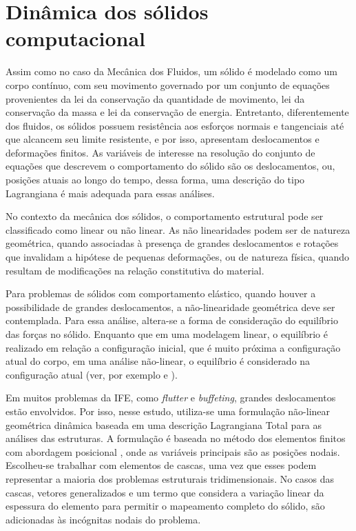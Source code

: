 \chapter[Dinâmica dos sólidos computacional]{Dinâmica dos sólidos computacional} \label{capitulo:Cap4}

Assim como no caso da Mecânica dos Fluidos, um sólido é modelado como um corpo contínuo, com seu movimento governado por um conjunto de equações provenientes da lei da conservação da quantidade de movimento, lei da conservação da massa e lei da conservação de energia. Entretanto, diferentemente dos fluidos, os sólidos possuem resistência aos esforços normais e tangenciais até que alcancem seu limite resistente, e por isso, apresentam deslocamentos e deformações finitos. As variáveis de interesse na resolução do conjunto de equações que descrevem o comportamento do sólido são os deslocamentos, ou, posições atuais ao longo do tempo, dessa forma, uma descrição do tipo Lagrangiana é mais adequada para essas análises.

No contexto da mecânica dos sólidos, o comportamento estrutural pode ser classificado como linear ou não linear. As não linearidades podem ser de natureza geométrica, quando associadas à presença de grandes deslocamentos e rotações que invalidam a hipótese de pequenas deformações, ou de natureza física, quando resultam de modificações na relação constitutiva do material.

Para problemas de sólidos com comportamento elástico, quando houver a possibilidade de grandes deslocamentos, a não-linearidade geométrica deve ser contemplada. Para essa análise, altera-se a forma de consideração do equilíbrio das forças no sólido. Enquanto que em uma modelagem linear, o equilíbrio é realizado em relação a configuração inicial, que é muito próxima a configuração atual do corpo, em uma análise não-linear, o equilíbrio é considerado na configuração atual (ver, por exemplo  e ).

Em muitos problemas da IFE, como \textit{flutter} e \textit{buffeting}, grandes deslocamentos estão envolvidos. Por isso, nesse estudo, utiliza-se uma formulação não-linear geométrica dinâmica baseada em uma descrição Lagrangiana Total para as análises das estruturas. A formulação é baseada no método dos elementos finitos com abordagem posicional \cite{Coda:2003,Coda:2018}, onde as variáveis principais são as posições nodais. Escolheu-se trabalhar com elementos de cascas, uma vez que esses podem representar a maioria dos problemas estruturais tridimensionais. No casos das cascas, vetores generalizados e um termo que considera a variação linear da espessura do elemento para permitir o mapeamento completo do sólido, são adicionadas às incógnitas nodais do problema. 

